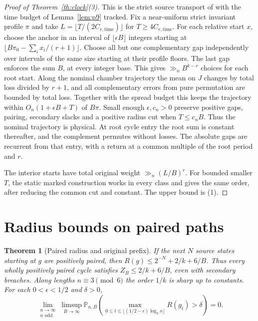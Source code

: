 \documentclass[11pt]{amsart}
\newtheorem{theorem}{Theorem}
\theoremstyle{definition}
\newcommand{\PP}{\mathbb P}
\begin{document}
\begin{proof}[Proof of Theorem~\ref{th:clock}(3)]
This is the strict source transport of \cite[Proposition~7]{G10} with
the time budget of Lemma~\ref{lem:p9} tracked.
Fix a near-uniform strict invariant profile \(\pi\) and take
\(L=\lfloor T/(2C_{r,\mathrm{time}})\rfloor\) for
\(T\ge4C_{r,\mathrm{time}}\).
For each relative start \(x\), choose the anchor in an interval
of \(\lfloor\epsilon B\rfloor\) integers starting at
\(\lfloor B\pi_0-\sum_i x_i/(r+1)\rfloor\).
Choose all but one complementary gap independently over intervals
of the same size starting at their profile floors.
The last gap enforces the sum \(B\), at every integer base.
This gives \(\gg_n B^{k-r}\) choices for each root start.
Along the nominal chamber trajectory the mean on \(J\) changes
by total loss divided by \(r+1\), and all complementary errors
from pure permutation are bounded by total loss. Together with
the spread budget this keeps the trajectory within
\(O_n(1+\epsilon B+T)\) of \(B\pi\).
Small enough \(\epsilon,c_n>0\) preserve positive gaps, pairing,
secondary slacks and a positive radius cut when \(T\le c_n B\).
Thus the nominal trajectory is physical. At root cycle entry the
root sum is constant thereafter, and the complement permutes
without losses. The absolute gaps are recurrent from that
entry, with a return at a common multiple of the root period
and \(r\).

The interior starts have total original weight
\(\gg_n (L/B)^r\).
For bounded smaller \(T\), the static marked construction works
in every class and gives the same order, after reducing the
common cut and constant. The upper bound is (1).
\end{proof}

\section{Radius bounds on paired paths}\label{sec:radius}

\begin{theorem}[Paired radius and original prefix]\label{th:radius}
If the next \(N\) source states starting at \(g\) are positively
paired, then \(R(g)\le2^{-N}+2/k+6/B\).
Thus every wholly positively paired cycle satisfies
\(Z_B\le2/k+6/B\), even with secondary breaches.
Along lengths \(n\equiv3\pmod6\) the order \(1/k\) is sharp up to
constants.
For each \(0<\epsilon<1/2\) and \(\delta>0\),
\[
 \lim_{\substack{n\to\infty\\n\text{ odd}}}\limsup_{B\to\infty}
 \PP_{n,B}\!\left(\max_{0\le t\le\lfloor(1/2-\epsilon)\log_3 n\rfloor}
 R(g_t)>\delta\right)=0.
\]
\end{theorem}
\end{document}

